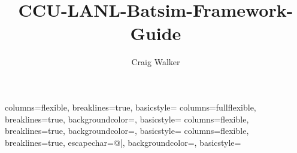 \documentclass[titlepage]{article}
\author{Craig Walker}
\title{CCU-LANL-Batsim-Framework-Guide}
\begin{document}
\sffamily
\allsectionsfont{\normalfont\sffamily\bfseries}


{
 	columns=flexible,
 	breaklines=true,
    basicstyle={\normalsize\color{black}\sffamily}
}
{
 	columns=fullflexible,
 	breaklines=true,
	backgroundcolor=\color{black!15},
    basicstyle=\small\color{myTerminalRed}\ttfamily
}
{
 	columns=flexible,
 	breaklines=true,
	backgroundcolor=\color{black!15},
    basicstyle=\small\color{myTerminalRed}\ttfamily
}
{
	columns=flexible,
	breaklines=true,
	escapechar=@|,
	backgroundcolor=\color{codelist!50},
    basicstyle=\small\ttfamily
}


\maketitle
\hypersetup{linkcolor=blue,urlcolor=blue,anchorcolor=blue}
\tableofcontents
\pagebreak
\end{document}
